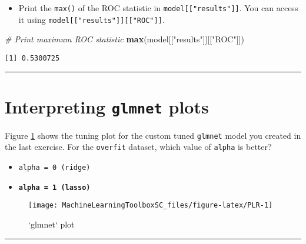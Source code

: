 \documentclass[
]{book}
\newenvironment{Shaded}{\begin{snugshade}}{\end{snugshade}}
\newcommand{\CommentTok}[1]{\textcolor[rgb]{0.56,0.35,0.01}{\textit{#1}}}
\newcommand{\KeywordTok}[1]{\textcolor[rgb]{0.13,0.29,0.53}{\textbf{#1}}}
\newcommand{\NormalTok}[1]{#1}
\newcommand{\StringTok}[1]{\textcolor[rgb]{0.31,0.60,0.02}{#1}}
\providecommand{\tightlist}{%
  \setlength{\itemsep}{0pt}\setlength{\parskip}{0pt}}
\begin{document}
\begin{itemize}
\tightlist
\item
  Print the \texttt{max()} of the ROC statistic in \texttt{model{[}{[}"results"{]}{]}}. You can access it using \texttt{model{[}{[}"results"{]}{]}{[}{[}"ROC"{]}{]}}.
\end{itemize}

\begin{Shaded}
\begin{Highlighting}[]
\CommentTok{# Print maximum ROC statistic}
\KeywordTok{max}\NormalTok{(model[[}\StringTok{"results"}\NormalTok{]][[}\StringTok{"ROC"}\NormalTok{]])}
\end{Highlighting}
\end{Shaded}

\begin{verbatim}
[1] 0.5300725
\end{verbatim}

\begin{center}\rule{0.5\linewidth}{0.5pt}\end{center}

\hypertarget{interpreting-glmnet-plots}{%
\section{\texorpdfstring{Interpreting \texttt{glmnet} plots}{Interpreting glmnet plots}}\label{interpreting-glmnet-plots}}

Figure \ref{fig:PLR} shows the tuning plot for the custom tuned \texttt{glmnet} model you created in the last exercise. For the \texttt{overfit} dataset, which value of \texttt{alpha} is better?

\begin{itemize}
\item
  \texttt{alpha\ =\ 0\ (ridge)}
\item
  \textbf{\texttt{alpha\ =\ 1\ (lasso)}}
\end{itemize}

\begin{figure}

{\centering \texttt{[image: MachineLearningToolboxSC\_files/figure-latex/PLR-1]} 

}

\caption{`glmnet` plot}\label{fig:PLR}
\end{figure}

\begin{center}\rule{0.5\linewidth}{0.5pt}\end{center}
\end{document}
